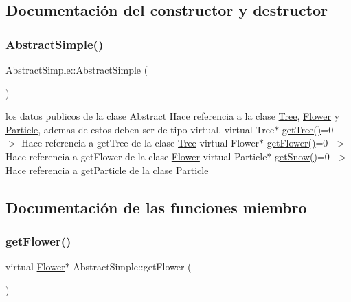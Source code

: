 \subsection{Documentación del constructor y destructor}
\mbox{\label{class_abstract_simple_a57d8b82248ae0f609b02b84978f54500}} 
\subsubsection{\texorpdfstring{AbstractSimple()}{AbstractSimple()}}
{\footnotesize\ttfamily Abstract\+Simple\+::\+Abstract\+Simple (\begin{DoxyParamCaption}{ }\end{DoxyParamCaption})\hspace{0.3cm}{\ttfamily [inline]}}

los datos publicos de la clase Abstract Hace referencia a la clase \mbox{\hyperlink{class_tree}{Tree}}, \mbox{\hyperlink{class_flower}{Flower}} y \mbox{\hyperlink{class_particle}{Particle}}, ademas de estos deben ser de tipo virtual. virtual Tree$\ast$ \mbox{\hyperlink{class_abstract_simple_ad90f5d7d3415a29af8bbf10ad8d89772}{get\+Tree()}}=0 -\/$>$ Hace referencia a get\+Tree de la clase \mbox{\hyperlink{class_tree}{Tree}} virtual Flower$\ast$ \mbox{\hyperlink{class_abstract_simple_a32da8b68a506bf223035acc62451724f}{get\+Flower()}}=0 -\/$>$ Hace referencia a get\+Flower de la clase \mbox{\hyperlink{class_flower}{Flower}} virtual Particle$\ast$ \mbox{\hyperlink{class_abstract_simple_aad971de50be686f491109651a387ce5e}{get\+Snow()}}=0 -\/$>$ Hace referencia a get\+Particle de la clase \mbox{\hyperlink{class_particle}{Particle}} 

\subsection{Documentación de las funciones miembro}
\mbox{\label{class_abstract_simple_a32da8b68a506bf223035acc62451724f}} 
\subsubsection{\texorpdfstring{getFlower()}{getFlower()}}
{\footnotesize\ttfamily virtual \mbox{\hyperlink{class_flower}{Flower}}$\ast$ Abstract\+Simple\+::get\+Flower (\begin{DoxyParamCaption}{ }\end{DoxyParamCaption})\hspace{0.3cm}{\ttfamily [pure virtual]}}



